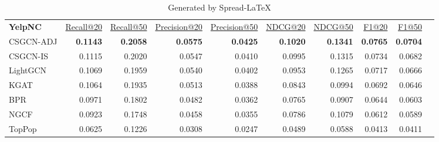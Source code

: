 
\begin{table}[!htp]\centering
\caption{Generated by Spread-LaTeX}\label{tab: }
\scriptsize
\begin{tabular}{lrrrrrrrrr}\toprule
\textbf{YelpNC} &\ul{Recall@20} &\ul{Recall@50} &\ul{Precision@20} &\ul{Precision@50} &\ul{NDCG@20} &\ul{NDCG@50} &\ul{F1@20} &\ul{F1@50} \\\cmidrule{1-9}
CSGCN-ADJ &\textbf{0.1143} &\textbf{0.2058} &\textbf{0.0575} &\textbf{0.0425} &\textbf{0.1020} &\textbf{0.1341} &\textbf{0.0765} &\textbf{0.0704} \\\cmidrule{1-9}
CSGCN-IS &0.1115 &0.2020 &0.0547 &0.0410 &0.0995 &0.1315 &0.0734 &0.0682 \\\cmidrule{1-9}
LightGCN &0.1069 &0.1959 &0.0540 &0.0402 &0.0953 &0.1265 &0.0717 &0.0666 \\\cmidrule{1-9}
KGAT &0.1064 &0.1935 &0.0513 &0.0388 &0.0843 &0.0994 &0.0692 &0.0646 \\\cmidrule{1-9}
BPR &0.0971 &0.1802 &0.0482 &0.0362 &0.0765 &0.0907 &0.0644 &0.0603 \\\cmidrule{1-9}
NGCF &0.0923 &0.1748 &0.0458 &0.0355 &0.0786 &0.1079 &0.0612 &0.0589 \\\cmidrule{1-9}
TopPop &0.0625 &0.1226 &0.0308 &0.0247 &0.0489 &0.0588 &0.0413 &0.0411 \\\cmidrule{1-9}
\bottomrule
\end{tabular}
\end{table}